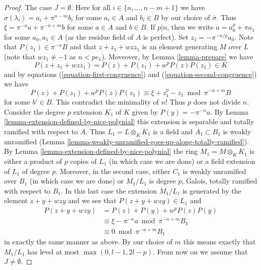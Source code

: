 \begin{proof}
\medskip\noindent
The case $J = \emptyset$. Here for all $i \in \{n, \ldots, n - m + 1\}$
we have $\sigma(\lambda_i) = a_i + \pi^{n - m}b_i$ for some $a_i \in A$
and $b_i \in B$ by our choice of $\overline{\sigma}$. Thus
$\xi = \pi^{-n} a + \pi^{-n + m} b$ for some $a \in A$ and $b \in B$.
If $p | n$, then we write $a = a_0^p + \pi a_1$ for some $a_0, a_1 \in A$
(as the residue field of $A$ is perfect). Set $z_1 = - \pi^{-n/p} a_0$.
Note that $P(z_1) \in \pi^{-n}B$ and that $z + z_1 + w z z_1$ is an
element generating $M$ over $L$ (note that $wz_1 \not = -1$ as
$n < pe_1$). Moveover, by Lemma \ref{lemma-prepare} we have
$$
P(z + z_1 + w z z_1) = P(z) + P(z_1) + w^p P(z) P(z_1) \in K
$$
and by equations (\ref{equation-first-congruence}) and
(\ref{equation-second-congruence}) we have
$$
P(z) + P(z_1) + w^p P(z) P(z_1)
\equiv
\xi + z_1^p - z_1 \bmod \pi^{-n + m}B
$$
for some $b' \in B$. This contradict the minimality of $n$! Thus $p$
does not divide $n$. Consider the degree $p$ extension $K_1$ of $K$ given
by $P(y) = -\pi^{-n}a$. By Lemma \ref{lemma-extension-defined-by-nice-polynial}
this extension is separable and totally ramified with respect to $A$.
Thus $L_1 = L \otimes_K K_1$
is a field and $A_1 \subset B_1$ is weakly unramified
(Lemma \ref{lemma-weakly-unramified-goes-up-along-totally-ramified}).
By Lemma \ref{lemma-extension-defined-by-nice-polynial}
the ring $M_1 = M \otimes_K K_1$ is either a product of $p$ copies
of $L_1$ (in which case we are done) or a field extension of $L_1$
of degree $p$. Moreover, in the second case, either $C_1$ is weakly unramified
over $B_1$ (in which case we are done) or $M_1/L_1$ is degree $p$,
Galois, totally ramified with respect to $B_1$.
In this last case the extension $M_1/L_1$
is generated by the element $z + y + wzy$ and we see that
$P(z + y + wzy) \in L_1$ and
\begin{align*}
P(z + y + wzy)
& = P(z) + P(y) + w^p P(z) P(y) \\
& \equiv
\xi - \pi^{-n}a \bmod \pi^{-n + m}B_1 \\
& \equiv
0 \bmod \pi^{-n + m}B_1
\end{align*}
in exactly the same manner as above. By our choice of $m$ this
means exactly that $M_1/L_1$ has level at most $\max(0, l - 1, 2l - p)$.
From now on we assume that $J \not = \emptyset$.


\end{proof}
